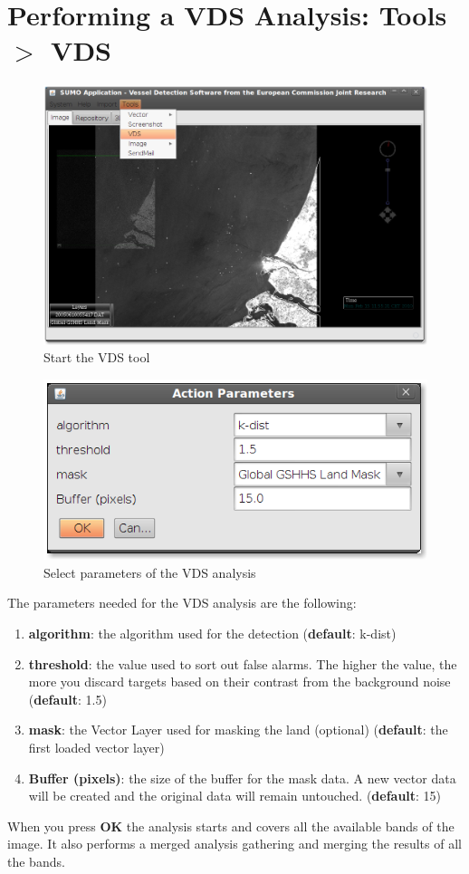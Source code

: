 \documentclass[12pt,a4paper,final]{report}
\begin{document}
\section{Performing a VDS Analysis: Tools $>$ VDS}
\begin{figure}[H]
 \centering
 \includegraphics[scale=0.45,keepaspectratio=true]{./images/VDS1.png}
 \caption{Start the VDS tool}
\end{figure}

\begin{figure}[H]
 \centering
 \includegraphics[scale=0.45,keepaspectratio=true]{./images/VDS2.png}
 \caption{Select parameters of the VDS analysis}
\end{figure}

The parameters needed for the VDS analysis are the following:
\begin{enumerate}
 \item \textbf{algorithm}: the algorithm used for the detection (\textbf{default}: k-dist)
 \item \textbf{threshold}: the value used to sort out  false alarms.
The higher the value, the more you discard targets based on their contrast from the background noise (\textbf{default}: 1.5)
 \item \textbf{mask}: the Vector Layer used for masking the land (optional) (\textbf{default}: the first loaded vector layer)
 \item \textbf{Buffer (pixels)}: the size of the buffer for the mask data.
A new vector data will be created and the original data will remain untouched. (\textbf{default}: 15) 
\end{enumerate}
When you press \textbf{OK} the analysis starts and covers all the available bands of the image.
It also performs a merged analysis gathering and merging the results of all the bands.
\end{document}
